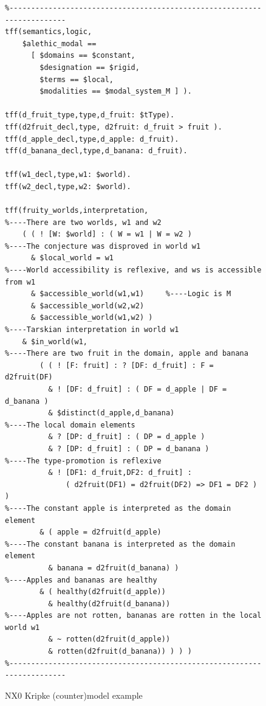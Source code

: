 \documentclass{ceurart}
\begin{document}
\begin{figure}[h!]
\small
{}
\begin{verbatim}
%------------------------------------------------------------------------
tff(semantics,logic,
    $alethic_modal ==
      [ $domains == $constant,
        $designation == $rigid,
        $terms == $local,
        $modalities == $modal_system_M ] ).

tff(d_fruit_type,type,d_fruit: $tType).
tff(d2fruit_decl,type, d2fruit: d_fruit > fruit ).
tff(d_apple_decl,type,d_apple: d_fruit).
tff(d_banana_decl,type,d_banana: d_fruit).

tff(w1_decl,type,w1: $world).
tff(w2_decl,type,w2: $world).

tff(fruity_worlds,interpretation,
%----There are two worlds, w1 and w2
    ( ( ! [W: $world] : ( W = w1 | W = w2 )
%----The conjecture was disproved in world w1
      & $local_world = w1
%----World accessibility is reflexive, and ws is accessible from w1
      & $accessible_world(w1,w1)     %----Logic is M
      & $accessible_world(w2,w2)
      & $accessible_world(w1,w2) )
%----Tarskian interpretation in world w1
    & $in_world(w1,
%----There are two fruit in the domain, apple and banana
        ( ( ! [F: fruit] : ? [DF: d_fruit] : F = d2fruit(DF)
          & ! [DF: d_fruit] : ( DF = d_apple | DF = d_banana )
          & $distinct(d_apple,d_banana)
%----The local domain elements
          & ? [DP: d_fruit] : ( DP = d_apple )
          & ? [DP: d_fruit] : ( DP = d_banana )
%----The type-promotion is reflexive
          & ! [DF1: d_fruit,DF2: d_fruit] :
              ( d2fruit(DF1) = d2fruit(DF2) => DF1 = DF2 ) )
%----The constant apple is interpreted as the domain element
        & ( apple = d2fruit(d_apple)
%----The constant banana is interpreted as the domain element
          & banana = d2fruit(d_banana) )
%----Apples and bananas are healthy
        & ( healthy(d2fruit(d_apple))
          & healthy(d2fruit(d_banana))
%----Apples are not rotten, bananas are rotten in the local world w1
          & ~ rotten(d2fruit(d_apple))
          & rotten(d2fruit(d_banana)) ) ) )
%------------------------------------------------------------------------
\end{verbatim}
\caption{NX0 Kripke (counter)model example}
\label{NX0Kripke}
\end{figure}
\end{document}
